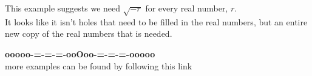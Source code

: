 \documentclass{ximera}
\begin{document}
This example suggests we need $\sqrt{-r}$ for every real number, $r$. \\





It looks like it isn't holes that need to be filled in the real numbers, but an entire new copy of the real numbers that is needed.








\begin{center}
\textbf{\textcolor{green!50!black}{ooooo-=-=-=-ooOoo-=-=-=-ooooo}} \\

more examples can be found by following this link\\ 

\end{center}
\end{document}
